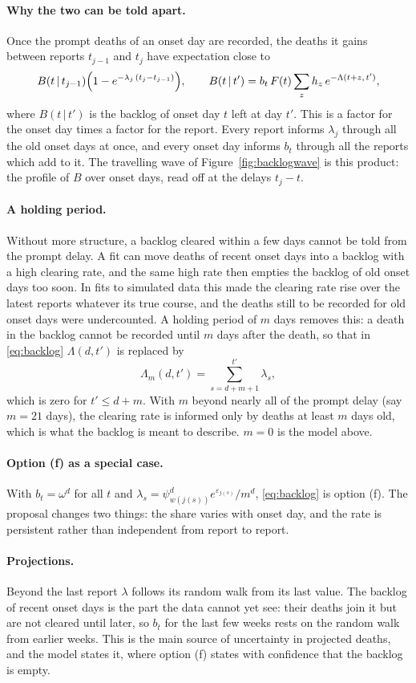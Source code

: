 \documentclass[11pt,a4paper]{article}
\newcommand{\given}{\,|\,}
\begin{document}
\paragraph{Why the two can be told apart.} Once the prompt deaths of an onset
day are recorded, the deaths it gains between reports $t_{j-1}$ and $t_j$
have expectation close to
\[
B(t\given t_{j-1})\Bigl(1-e^{-\lambda_j\,(t_j-t_{j-1})}\Bigr),\qquad
B(t\given t')=b_t\,F(t)\sum_{z}h_z\,e^{-\Lambda(t+z,\,t')},
\]
where $B(t\given t')$ is the backlog of onset day $t$ left at day $t'$. This
is a factor for the onset day times a factor for the report. Every report
informs $\lambda_j$ through all the old onset days at once, and every onset
day informs $b_t$ through all the reports which add to it. The travelling
wave of Figure~\ref{fig:backlogwave} is this product: the profile of $B$ over
onset days, read off at the delays $t_j-t$.

\paragraph{A holding period.} Without more structure, a backlog cleared
within a few days cannot be told from the prompt delay. A fit can move deaths
of recent onset days into a backlog with a high clearing rate, and the same
high rate then empties the backlog of old onset days too soon. In fits to
simulated data this made the clearing rate rise over the latest reports
whatever its true course, and the deaths still to be recorded for old onset
days were undercounted. A holding period of $m$ days removes this: a death in
the backlog cannot be recorded until $m$ days after the death, so that in
\eqref{eq:backlog} $\Lambda(d,t')$ is replaced by
\[
\Lambda_m(d,t')=\sum_{s=d+m+1}^{t'}\lambda_s,
\]
which is zero for $t'\le d+m$. With $m$ beyond nearly all of the prompt delay
(say $m=21$ days), the clearing rate is informed only by deaths at least $m$
days old, which is what the backlog is meant to describe. $m=0$ is the model
above.

\paragraph{Option (f) as a special case.} With $b_t=\omega^{d}$ for all $t$ and
$\lambda_s=\psi^{d}_{w(j(s))}e^{\varepsilon_{j(s)}}/m^{d}$, \eqref{eq:backlog} is
option (f). The proposal changes two things: the share varies with onset
day, and the rate is persistent rather than independent from report to
report.

\paragraph{Projections.} Beyond the last report $\lambda$ follows its random
walk from its last value. The backlog of recent onset days is the part the
data cannot yet see: their deaths join it but are not cleared until later,
so $b_t$ for the last few weeks rests on the random walk from earlier weeks.
This is the main source of uncertainty in projected deaths, and the model
states it, where option (f) states with confidence that the backlog is
empty.
\end{document}
